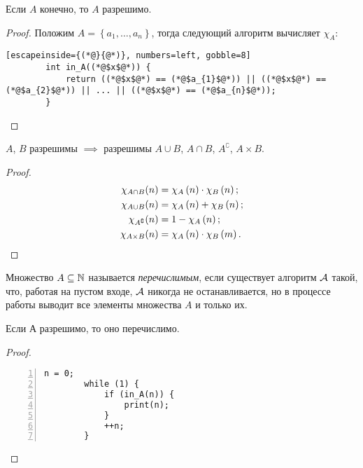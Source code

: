 \begin{statement}
    Если $A$ конечно, то $A$ разрешимо.
\end{statement}
\begin{proof}
    Положим $A = \left\{a_{1}, \ldots, a_{n}\right\}$, тогда следующий алгоритм вычисляет $\chi_{A}$:
    \begin{lstlisting}[escapeinside={(*@}{@*)}, numbers=left, gobble=8]
        int in_A((*@$x$@*)) {
            return ((*@$x$@*) == (*@$a_{1}$@*)) || ((*@$x$@*) == (*@$a_{2}$@*)) || ... || ((*@$x$@*) == (*@$a_{n}$@*));
        }
    \end{lstlisting}
\end{proof}

\begin{statement}
    $A$, $B$ разрешимы $\implies$ разрешимы $A \cup B$, $A \cap B$, $A^{\complement}$, $A \times B$.
\end{statement}
\begin{proof}~
    \begin{align}
        \chi_{A \cap B}(n) &= \chi_{A}\left(n\right) \cdot \chi_{B}\left(n\right); \\
        \chi_{A \cup B}(n) &= \chi_{A}\left(n\right) + \chi_{B}\left(n\right); \\
        \chi_{A^{\complement}}(n) &= 1 - \chi_{A}\left(n\right); \\
        \chi_{A \times B}(n) &= \chi_{A}\left(n\right) \cdot \chi_{B}\left(m\right).
        \qedhere
    \end{align}
\end{proof}

\begin{definition}
    Множество $A \subseteq \N$ называется {\it перечислимым}, если существует алгоритм $\AA$ такой, что, работая на пустом входе, $\AA$ никогда не останавливается, но в процессе работы выводит все элементы множества $A$ и только их.
\end{definition}

\begin{statement}
    Если А разрешимо, то оно перечислимо.
\end{statement}
\begin{proof}~
    \begin{lstlisting}[frame=single, numbers=left, gobble=4]
        n = 0;
        while (1) {
            if (in_A(n)) {
                print(n);
            }
            ++n;
        }
    \end{lstlisting}
\end{proof}

